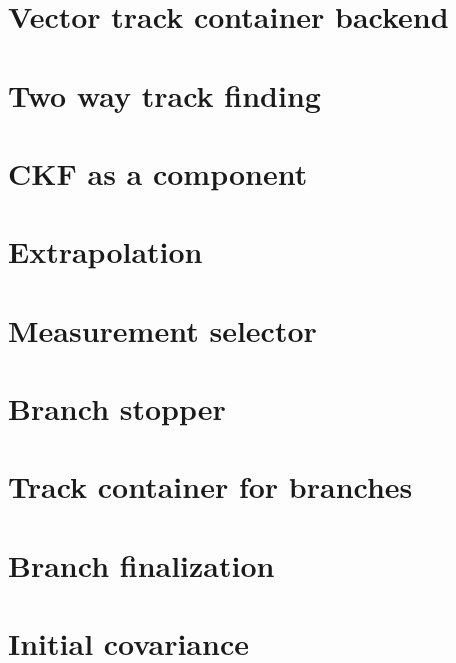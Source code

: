 \section{Vector track container backend}

\section{Two way track finding}

\section{CKF as a component}

\section{Extrapolation}

\section{Measurement selector}

\section{Branch stopper}

\section{Track container for branches}

\section{Branch finalization}

\section{Initial covariance}
